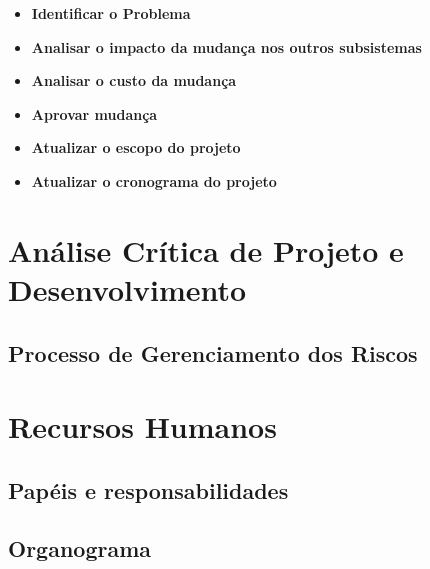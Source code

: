 \begin{itemize}

\item \textbf{Identificar o Problema}

\item \textbf{Analisar o impacto da mudança nos outros subsistemas}

\item \textbf{Analisar o custo da mudança}

\item\textbf{ Aprovar mudança}

\item \textbf{Atualizar o escopo do projeto}

\item \textbf{Atualizar o cronograma do projeto}

\end{itemize}

\section{Análise Crítica de Projeto e Desenvolvimento}

\subsection{Processo de Gerenciamento dos Riscos}


\section{Recursos Humanos}
\subsection{Papéis e responsabilidades}

\subsection{Organograma}    

    
    

